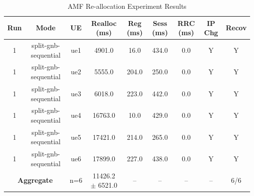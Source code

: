 \begin{table}[ht]
\centering
\begin{tabular}{|c|c|c|c|c|c|c|c|c|}
\hline
Run & Mode & UE & Realloc (ms) & Reg (ms) & Sess (ms) & RRC (ms) & IP Chg & Recov \\
\hline
1 & split-gnb-sequential & ue1 & 4901.0 & 16.0 & 434.0 & 0.0 & Y & Y \\
1 & split-gnb-sequential & ue2 & 5555.0 & 204.0 & 250.0 & 0.0 & Y & Y \\
1 & split-gnb-sequential & ue3 & 6018.0 & 223.0 & 442.0 & 0.0 & Y & Y \\
1 & split-gnb-sequential & ue4 & 16763.0 & 10.0 & 429.0 & 0.0 & Y & Y \\
1 & split-gnb-sequential & ue5 & 17421.0 & 214.0 & 265.0 & 0.0 & Y & Y \\
1 & split-gnb-sequential & ue6 & 17899.0 & 227.0 & 438.0 & 0.0 & Y & Y \\
\multicolumn{2}{|c|}{\textbf{Aggregate}} & n=6 & 11426.2 $\pm$ 6521.0 & -- & -- & -- & -- & 6/6 \\
\hline
\end{tabular}
\caption{AMF Re-allocation Experiment Results}
\label{tab:amf_realloc}
\end{table}
